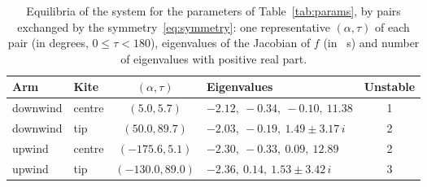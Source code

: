 \begin{table}[thpb]
\centering
\caption{Equilibria of the system for the parameters of Table~\ref{tab:params}, by pairs exchanged by the symmetry~\eqref{eq:symmetry}: one representative \((\alpha, \tau)\) of each pair (in degrees, \(0 \leq \tau < 180\)), eigenvalues of the Jacobian of \(f\) (in \si{\per\second}) and number of eigenvalues with positive real part.}
\label{tab:equilibria}
\begin{tabular}{l l c l c}
    \toprule
    {Arm} & {Kite} & {\((\alpha, \tau)\)} & {Eigenvalues} & {Unstable} \\
    \midrule
    downwind & centre & $(5.0, 5.7)$ & $-2.12,\ -0.34,\ -0.10,\ 11.38$ & 1 \\
    downwind & tip & $(50.0, 89.7)$ & $-2.03,\ -0.19,\ 1.49 \pm 3.17\,i$ & 2 \\
    upwind & centre & $(-175.6, 5.1)$ & $-2.30,\ -0.33,\ 0.09,\ 12.89$ & 2 \\
    upwind & tip & $(-130.0, 89.0)$ & $-2.36,\ 0.14,\ 1.53 \pm 3.42\,i$ & 3 \\
    \bottomrule
\end{tabular}
\end{table}
